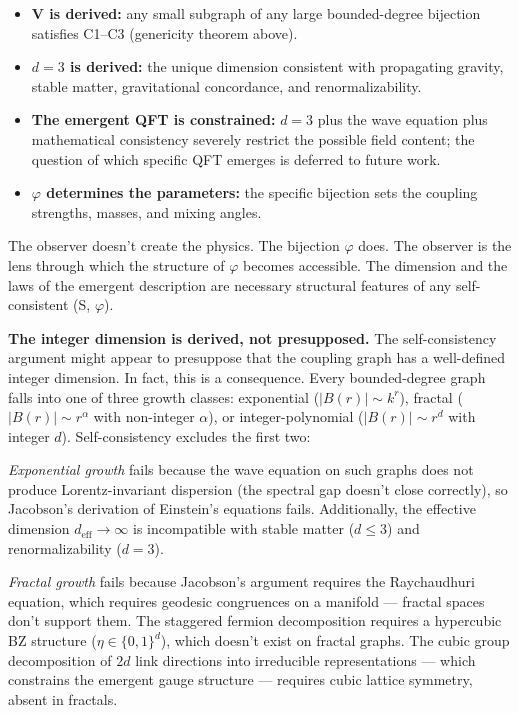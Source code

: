\documentclass[
  11pt,
]{article}
\providecommand{\tightlist}{%
  \setlength{\itemsep}{0pt}\setlength{\parskip}{0pt}}
\begin{document}
\begin{itemize}
\tightlist
\item
  \textbf{V is derived:} any small subgraph of any large bounded-degree
  bijection satisfies C1--C3 (genericity theorem above).
\item
  \textbf{\(d = 3\) is derived:} the unique dimension consistent with
  propagating gravity, stable matter, gravitational concordance, and
  renormalizability.
\item
  \textbf{The emergent QFT is constrained:} \(d = 3\) plus the wave
  equation plus mathematical consistency severely restrict the possible
  field content; the question of which specific QFT emerges is deferred
  to future work.
\item
  \textbf{\(\varphi\) determines the parameters:} the specific bijection
  sets the coupling strengths, masses, and mixing angles.
\end{itemize}

The observer doesn't create the physics. The bijection \(\varphi\) does.
The observer is the lens through which the structure of \(\varphi\)
becomes accessible. The dimension and the laws of the emergent
description are necessary structural features of any self-consistent (S,
\(\varphi\)).

\textbf{The integer dimension is derived, not presupposed.} The
self-consistency argument might appear to presuppose that the coupling
graph has a well-defined integer dimension. In fact, this is a
consequence. Every bounded-degree graph falls into one of three growth
classes: exponential (\(|B(r)| \sim k^r\)), fractal
(\(|B(r)| \sim r^\alpha\) with non-integer \(\alpha\)), or
integer-polynomial (\(|B(r)| \sim r^d\) with integer \(d\)).
Self-consistency excludes the first two:

\emph{Exponential growth} fails because the wave equation on such graphs
does not produce Lorentz-invariant dispersion (the spectral gap doesn't
close correctly), so Jacobson's derivation of Einstein's equations
fails. Additionally, the effective dimension
\(d_{\text{eff}} \to \infty\) is incompatible with stable matter
(\(d \leq 3\)) and renormalizability (\(d = 3\)).

\emph{Fractal growth} fails because Jacobson's argument requires the
Raychaudhuri equation, which requires geodesic congruences on a manifold
--- fractal spaces don't support them. The staggered fermion
decomposition requires a hypercubic BZ structure
(\(\eta \in \{0,1\}^d\)), which doesn't exist on fractal graphs. The
cubic group decomposition of \(2d\) link directions into irreducible
representations --- which constrains the emergent gauge structure ---
requires cubic lattice symmetry, absent in fractals.
\end{document}

